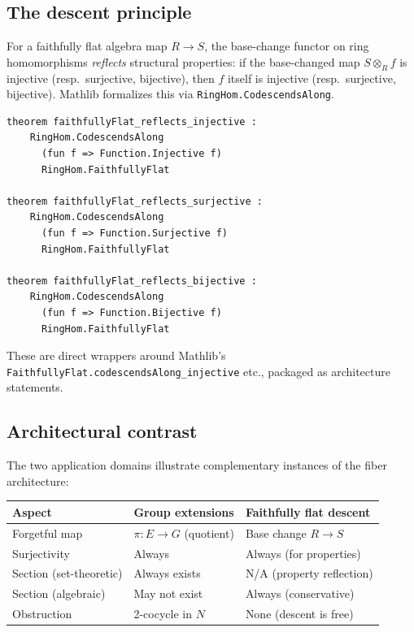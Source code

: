 \documentclass[11pt]{article}
\newcommand{\lean}[1]{\texttt{#1}}
\begin{document}
\subsection{The descent principle}\label{sec:descent-principle}

For a faithfully flat algebra map $R \to S$, the base-change functor on ring
homomorphisms \emph{reflects} structural properties: if the base-changed map
$S \otimes_R f$ is injective (resp.\ surjective, bijective), then $f$ itself is
injective (resp.\ surjective, bijective).  Mathlib formalizes this via
\lean{RingHom.CodescendsAlong}.

\begin{theorem}\label{thm:descent}
\begin{lstlisting}
theorem faithfullyFlat_reflects_injective :
    RingHom.CodescendsAlong
      (fun f => Function.Injective f)
      RingHom.FaithfullyFlat

theorem faithfullyFlat_reflects_surjective :
    RingHom.CodescendsAlong
      (fun f => Function.Surjective f)
      RingHom.FaithfullyFlat

theorem faithfullyFlat_reflects_bijective :
    RingHom.CodescendsAlong
      (fun f => Function.Bijective f)
      RingHom.FaithfullyFlat
\end{lstlisting}
\end{theorem}

\noindent
These are direct wrappers around Mathlib's
\lean{FaithfullyFlat.codescendsAlong\_injective} etc., packaged as architecture
statements.

\subsection{Architectural contrast}\label{sec:contrast}

The two application domains illustrate complementary instances of the fiber
architecture:

\begin{center}
\begin{tabular}{@{}lll@{}}
\toprule
\textbf{Aspect} & \textbf{Group extensions} & \textbf{Faithfully flat descent} \\
\midrule
Forgetful map & $\pi : E \to G$ (quotient) & Base change $R \to S$ \\
Surjectivity & Always & Always (for properties) \\
Section (set-theoretic) & Always exists & N/A (property reflection) \\
Section (algebraic) & May not exist & Always (conservative) \\
Obstruction & 2-cocycle in $N$ & None (descent is free) \\
\bottomrule
\end{tabular}
\end{center}
\end{document}
